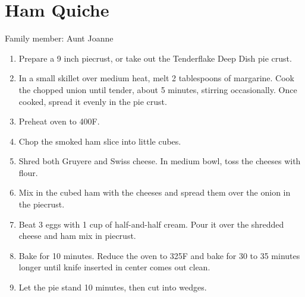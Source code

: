 \chapter{Ham Quiche}
\label{ch:hamquiche}


Family member: Aunt Joanne

\begin{enumerate}
    \item Prepare a 9 inch piecrust, or take out the Tenderflake Deep Dish pie crust.
    \item In a small skillet over medium heat, melt 2 tablespoons of margarine. Cook the chopped union until tender, about 5 minutes, stirring occasionally. Once cooked, spread it evenly in the pie crust.
    \item Preheat oven to 400\degree F.
    \item Chop the smoked ham slice into little cubes.
    \item Shred both Gruyere and Swiss cheese. In medium bowl, toss the cheeses with flour.
    \item Mix in the cubed ham with the cheeses and spread them over the onion in the piecrust.
    \item Beat 3 eggs with 1 cup of half-and-half cream. Pour it over the shredded cheese and ham mix in piecrust.
    \item Bake for 10 minutes. Reduce the oven to 325\degree F and bake for 30 to 35 minutes longer until knife inserted in center comes out clean.
    \item Let the pie stand 10 minutes, then cut into wedges.
\end{enumerate}
